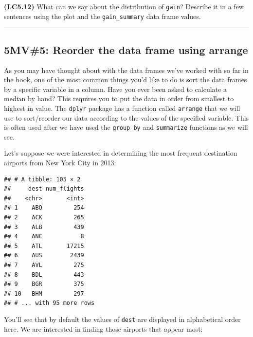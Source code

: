 \documentclass[]{tufte-book}
\newenvironment{Shaded}{\begin{snugshade}}{\end{snugshade}}
\newcommand{\KeywordTok}[1]{\textcolor[rgb]{0.13,0.29,0.53}{\textbf{{#1}}}}
\newcommand{\DataTypeTok}[1]{\textcolor[rgb]{0.13,0.29,0.53}{{#1}}}
\newcommand{\StringTok}[1]{\textcolor[rgb]{0.31,0.60,0.02}{{#1}}}
\newcommand{\NormalTok}[1]{{#1}}
\let\oldrule=\rule
\renewcommand{\rule}[1]{\oldrule{\linewidth}}
\begin{document}
\textbf{(LC5.12)} What can we say about the distribution of
\texttt{gain}? Describe it in a few sentences using the plot and the
\texttt{gain\_summary} data frame values.

\begin{center}\rule{0.5\linewidth}{\linethickness}\end{center}

\subsection{5MV\#5: Reorder the data frame using arrange}\label{arrange}

As you may have thought about with the data frames we've worked with so
far in the book, one of the most common things you'd like to do is sort
the data frames by a specific variable in a column. Have you ever been
asked to calculate a median by hand? This requires you to put the data
in order from smallest to highest in value. The \texttt{dplyr} package
has a function called \texttt{arrange} that we will use to sort/reorder
our data according to the values of the specified variable. This is
often used after we have used the \texttt{group\_by} and
\texttt{summarize} functions as we will see.

Let's suppose we were interested in determining the most frequent
destination airports from New York City in 2013:

\begin{Shaded}
\end{Shaded}

\begin{verbatim}
## # A tibble: 105 × 2
##     dest num_flights
##    <chr>       <int>
## 1    ABQ         254
## 2    ACK         265
## 3    ALB         439
## 4    ANC           8
## 5    ATL       17215
## 6    AUS        2439
## 7    AVL         275
## 8    BDL         443
## 9    BGR         375
## 10   BHM         297
## # ... with 95 more rows
\end{verbatim}

You'll see that by default the values of \texttt{dest} are displayed in
alphabetical order here. We are interested in finding those airports
that appear most:
\end{document}
